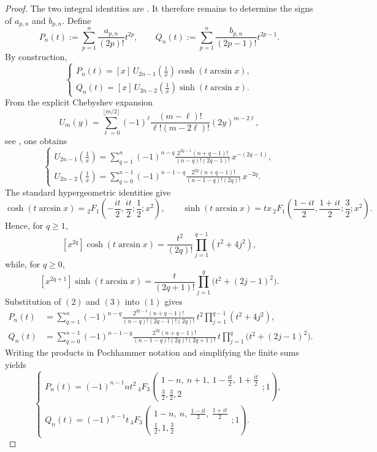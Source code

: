 \documentclass[11pt,twoside]{article}
\numberwithin{equation}{section}
\begin{document}
\begin{proof}
The two integral identities are \cite[Prop.~2.3]{TallaWaffo2026}.  It therefore remains to
determine the signs of \(a_{p,n}\) and \(b_{p,n}\). Define
\[
P_n(t):=\sum_{p=1}^{n}\frac{a_{p,n}}{(2p)!}t^{2p}, \qquad Q_n(t):=\sum_{p=1}^{n}\frac{b_{p,n}}{(2p-1)!}t^{2p-1}.
\]
By construction,
\[
\begin{cases} \displaystyle P_n(t)=[x]\,U_{2n-1}\!\left(\frac1x\right)\cosh(t\arcsin x),\\[2mm] \displaystyle Q_n(t)=[x]\,U_{2n-2}\!\left(\frac1x\right)\sinh(t\arcsin x).
\end{cases}
\tag{1}
\]
From the explicit Chebyshev expansion
\[
U_m(y)= \sum_{\ell=0}^{\lfloor m/2\rfloor} (-1)^\ell \frac{(m-\ell)!}{\ell!(m-2\ell)!}(2y)^{m-2\ell},
\]
see \cite[Eq.~(18.5.11\_3)]{NIST:DLMF}, one obtains
\[
\begin{cases} \displaystyle U_{2n-1}\!\left(\frac1x\right) = \sum_{q=1}^{n} (-1)^{n-q} \frac{2^{2q-1}(n+q-1)!}{(n-q)!(2q-1)!}\, x^{-(2q-1)},\\[4mm] \displaystyle U_{2n-2}\!\left(\frac1x\right) = \sum_{q=0}^{n-1} (-1)^{n-1-q} \frac{2^{2q}(n+q-1)!}{(n-1-q)!(2q)!}\, x^{-2q}.
\end{cases}
\tag{2}
\]
The standard hypergeometric identities \cite[Eqs.~(15.4.12),(15.4.16)]{NIST:DLMF} give
\[
\cosh(t\arcsin x) = {}_2F_1\!\left( -\frac{it}{2},\frac{it}{2};\frac12;x^2 \right), \qquad \sinh(t\arcsin x) = tx\,{}_2F_1\!\left( \frac{1-it}{2},\frac{1+it}{2};\frac32;x^2 \right).
\]
Hence, for \(q\geq1\),
\[
[x^{2q}]\cosh(t\arcsin x) = \frac{t^2}{(2q)!} \prod_{j=1}^{q-1}(t^2+4j^2),
\]
while, for \(q\geq0\),
\[
[x^{2q+1}]\sinh(t\arcsin x) = \frac{t}{(2q+1)!} \prod_{j=1}^{q}\bigl(t^2+(2j-1)^2\bigr). \tag{3}
\]
Substitution of \((2)\) and \((3)\) into \((1)\) gives
\[
\begin{aligned} P_n(t) &= \sum_{q=1}^{n} (-1)^{n-q} \frac{2^{2q-1}(n+q-1)!} {(n-q)!(2q-1)!(2q)!}\, t^2\prod_{j=1}^{q-1}(t^2+4j^2),\\ Q_n(t) &= \sum_{q=0}^{n-1} (-1)^{n-1-q} \frac{2^{2q}(n+q-1)!} {(n-1-q)!(2q)!(2q+1)!}\, t\prod_{j=1}^{q}\bigl(t^2+(2j-1)^2\bigr).
\end{aligned}
\tag{4}
\]
Writing the products in Pochhammer notation and simplifying the finite sums yields
\[
\begin{cases} \displaystyle P_n(t) = (-1)^{n-1}nt^2\, {}_4F_3\!\left( \begin{matrix} 1-n,\ n+1,\ 1-\frac{it}{2},\ 1+\frac{it}{2}\\ \frac32,\frac32,2 \end{matrix};1 \right),\\[5mm] \displaystyle Q_n(t) = (-1)^{n-1}t\, {}_4F_3\!\left( \begin{matrix} 1-n,\ n,\ \frac{1-it}{2},\ \frac{1+it}{2}\\ \frac12,1,\frac32 \end{matrix};1 \right).

\end{cases}\]
\end{proof}
\end{document}
